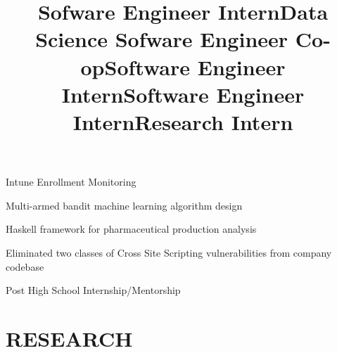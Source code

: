 \documentclass[line,margin,12pt]{resume}
\begin{document}
\begin{resume}
        \title{Sofware Engineer Intern}
        \begin{position}
            Intune Enrollment Monitoring
        \end{position}

        \title{Data Science Sofware Engineer Co-op}
        \begin{position}
             Multi-armed bandit machine learning algorithm design
        \end{position}

        \title{Software Engineer Intern}
        \begin{position}
            Haskell framework for pharmaceutical production analysis
        \end{position}

        \title{Software Engineer Intern}
        \begin{position}
            Eliminated two classes of Cross Site Scripting vulnerabilities from company codebase
        \end{position}

        \title{Research Intern}
        \begin{position}
            Post High School Internship/Mentorship
        \end{position}

        \section{RESEARCH}


\end{resume}
\end{document}
